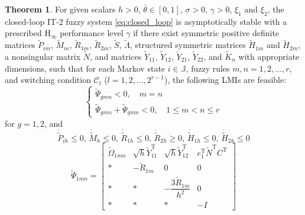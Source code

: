 \documentclass[preprint,review,fleqn,sort&compress,3p]{elsarticle}
\theoremstyle{definition} %
\theoremstyle{definition}%
\newtheorem{thm}{Theorem}[section]
\begin{document}
\begin{thm}\label{thm2}
 For given scalars $h > 0$, $\bar{\theta} \in [0,1]$, $\sigma > 0$, $\gamma > 0$, $\xi_1$ and $\xi_2$, the closed-loop IT-2 fuzzy system \eqref{eq:closed_loop} is asymptotically stable with a prescribed $\mathrm{H}_\infty$ performance level $\gamma$ if there exist symmetric positive definite matrices $\tilde{P}_{im}$, $\tilde{M}_{m}$, $\tilde{R}_{1m}$, $\tilde{R}_{2m}$, $\tilde{S}$, $\tilde{\Lambda}$, structured symmetric matrices $\tilde{H}_{1m}$ and $\tilde{H}_{2m}$, a nonsingular matrix $\tilde{N}$, and matrices $\tilde{Y}_{11}$, $\tilde{Y}_{12}$, $\tilde{Y}_{21}$, $\tilde{Y}_{22}$, and $\widetilde{K}_n$ with appropriate dimensions, such that for each Markov state $i \in \mathbb{J}$, fuzzy rules $m,n = 1,2,\ldots,r$, and switching condition $\mathcal{C}_l$ ($l = 1,2,\ldots,2^{r-1}$), the following LMIs are feasible:
	\begin{equation}\label{shucr1_not}
		\begin{cases}
			\widetilde{\Psi}_{gmn} < 0 	,\quad  m=n  \\
			\widetilde{\Psi}_{gmn} + \widetilde{\Psi}_{gnm} < 0,\quad 1 \le m 	< n \le r
		\end{cases}
	\end{equation}
	for $g=1,2$, and
	\begin{equation}\label{dot_hat_small_0}
	\dot{\widetilde{P}}_{ih} \leq 0, \, 
	\dot{\widetilde{M}}_{h} \leq 0, \, 
	\dot{\widetilde{R}}_{1h} \leq 0, \, 
	\dot{\widetilde{R}}_{2h} \geq 0, \, 
	\dot{\widetilde{H}}_{1h} \leq 0, \, 
	\dot{\widetilde{H}}_{2h} \leq 0
	\end{equation}
\begin{equation}\label{LMI1_not}
\widetilde{\Psi}_{1mn} =
\begin{bmatrix}
	\widetilde{\Omega}_{1mn} & \sqrt{h} \widetilde{Y}_{11}^{\mathrm{T}} & \sqrt{h} \widetilde{Y}_{12}^{\mathrm{T}} & e_1^{\mathrm{T}} \widetilde{N}^{\mathrm{T}} {C}^{\mathrm{T}}\\[1.5ex]
	* & -\widetilde{R}_{1m} & 0 & 0 \\[1.5ex]
	* & * & -\dfrac{3\widetilde{R}_{1m}}{h^2} & 0\\[1.5ex]
	* & * & * & -I
\end{bmatrix}
\end{equation}


\end{thm}
\end{document}
